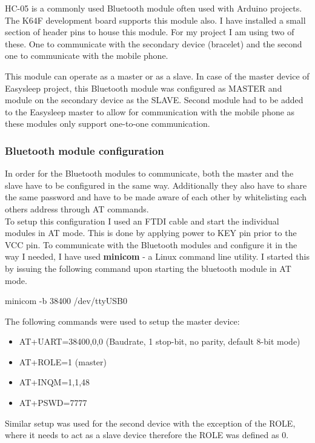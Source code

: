 \documentclass[12pt,a4paper]{article}
\begin{document}
		HC-05 is a commonly used Bluetooth module often used with Arduino projects. The K64F development board supports this module also. I have installed a small section of header pins to house this module. For my  
		project I am using two of these. One to communicate with the secondary device (bracelet) and the second one to communicate with the mobile phone.
		
		This module can operate as a master or as a slave. In case of the master device of Easysleep project, this Bluetooth module was configured as MASTER and module on the secondary device as the SLAVE. Second module had to be added to the Easysleep master to allow for communication with the mobile phone as these modules only support one-to-one communication.
		
		\subsubsection{Bluetooth module configuration}
		In order for the Bluetooth modules to communicate, both the master and the slave have to be configured in the same way. Additionally they also have to share the same password and have to be made aware of each other by whitelisting each others address through AT commands.\\ 
		
		To setup this configuration I used an FTDI cable and start the individual modules in AT mode. This is done by applying power to KEY pin prior to the VCC pin. To communicate with the Bluetooth modules and configure it in the way I needed, I have used {\bfseries minicom}  - a Linux command line utility. I started this by issuing the following command upon starting the bluetooth module in AT mode.
		\begin{center}
		 minicom -b 38400 /dev/ttyUSB0
		\end{center}
		The following commands were used to setup the master device:
		\begin{itemize}
		 \item AT+UART=38400,0,0 (Baudrate, 1 stop-bit, no parity, default 8-bit mode)
		 \item AT+ROLE=1 (master)
		 \item AT+INQM=1,1,48
		 \item AT+PSWD=7777
		\end{itemize}
		Similar setup was used for the second device with the exception of the ROLE, where it needs to act as a slave device therefore the ROLE was defined as 0.
		\newpage
		
\end{document}

